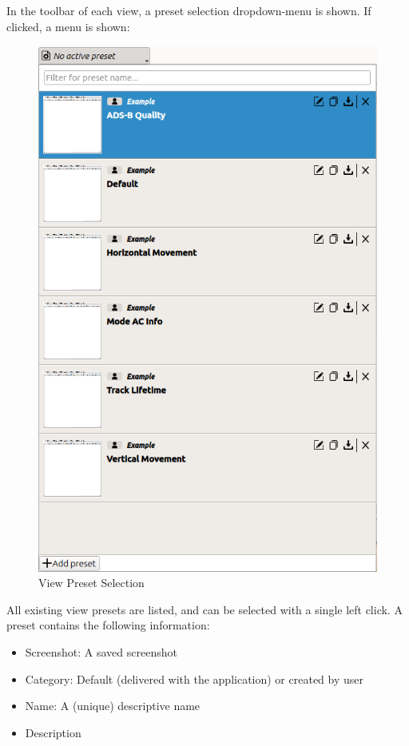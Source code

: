 In the toolbar of each view, a preset selection dropdown-menu is shown. If clicked, a menu is shown:

\begin{figure}[H]
    \includegraphics[width=12cm,frame]{figures/view_presets.png}
  \caption{View Preset Selection}
\end{figure}

All existing view presets are listed, and can be selected with a single left click. A preset contains the following information:

\begin{itemize}
 \item Screenshot: A saved screenshot 
 \item Category: Default (delivered with the application) or created by user
 \item Name: A (unique) descriptive name
 \item Description
\end{itemize} \ \\

